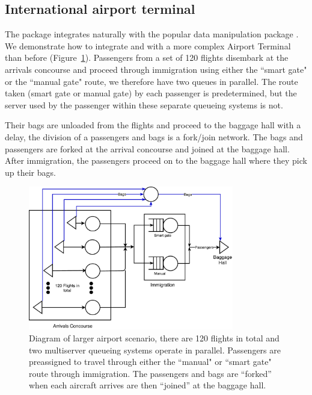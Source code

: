 \documentclass[article]{jss}
\begin{document}
\subsection{International airport terminal} \label{ssec:largerairport}

The package integrates naturally with the popular data manipulation  package  \citep{Rpkg_dplyr}. We demonstrate how to integrate  and  with a more complex Airport Terminal than before (Figure~\ref{fig:larger_airport}). Passengers from a set of 120 flights disembark at the arrivals concourse and proceed through immigration using either the ``smart gate" or the ``manual gate" route, we therefore have two queues in parallel. The route taken (smart gate or manual gate) by each passenger is predetermined, but the server used by the passenger within these separate queueing systems is not. 

Their bags are unloaded from the flights and proceed to the baggage hall with a delay, the division of a passengers and bags is a fork/join network. The bags and passengers are forked at the arrival concourse and joined at the baggage hall. After immigration, the passengers proceed on to the baggage hall where they pick up their bags. 

\begin{figure}[!htb]
\centering
\includegraphics[width = 0.8\textwidth]{figures/Larger_airport.pdf}
\caption{Diagram of larger airport scenario, there are 120 flights in total and two multiserver queueing systems operate in parallel. Passengers are preassigned to travel through either the ``manual" or ``smart gate" route through immigration. The passengers and bags are ``forked'' when each aircraft arrives are then ``joined'' at the baggage hall. }
\label{fig:larger_airport}
\end{figure}
\end{document}
